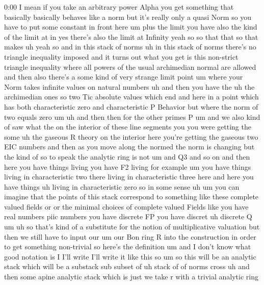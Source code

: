 \begin{unfinished}{0:00}
I  mean  if  you  take  an  arbitrary  power
Alpha  you  get  something  that  basically
basically  behaves  like  a  norm  but  it's
really  only  a  quasi  Norm  so  you  have  to
put  some  constant  in  front  here
um  plus  the  limit  you  have  also  the  kind
of  the  limit  at  in  yes  there's  also  the
limit  at  Infinity  yeah  so  so  that  that
so  that  makes  uh  yeah  so  and  in  this
stack  of  norms  uh  in  this  stack  of  norms
there's  no  triangle  inequality  imposed
and  it  turns  out  what  you  get  is  this
non-strict  triangle  inequality  where  all
powers  of  the  usual  archimedian  normal
are  allowed  and  then  also  there's  a  some
kind  of  very  strange  limit  point  um
where  your  Norm  takes  infinite  values  on
natural
numbers  uh  and  then  you  have  the  uh  the
archimedian  ones  so  two  Tic  absolute
values  which  end  and  here  in  a  point
which  has  both  characteristic  zero  and
characteristic  P  Behavior  but  where  the
norm  of  two  equals  zero
um  uh  and  then  then  for  the  other  primes
P  um
and  we  also  kind  of  saw  what  the  on  the
interior  of  these  line  segments  you  you
were  getting  the
some  uh  the  gaseous  R  theory  on  the
interior  here  you're  getting  the  gaseous
two  EIC  numbers  and  then  as  you  move
along  the  normed  the  norm  is  changing
but  the  kind  of  so  to  speak  the  analytic
ring  is  not  um  and  Q3  and  so  on  and  then
here  you  have  things  living  you  have  F2
living  for  example  um  you  have  things
living  in  characteristic  two  there
living  in  characteristic  three  here  and
here  you  have  things  uh  living  in
characteristic  zero  so  in  some  sense
uh
um  you  can  imagine  that  the  points  of
this  stack  correspond  to  something  like
these  complete  valued  fields  or  or  the
minimal  choices  of  complete  valued
Fields  like  you  have  real  numbers  piic
numbers  you  have  discrete  FP  you  have
discret  uh  discrete  Q
um  uh  so  that's  kind  of  a  substitute  for
the  notion  of  multiplicative  valuation
but  then  we  still  have  to  input  our  um
our  Bon  ring  R  into  the  construction  in
order  to  get  something  non-trivial  so
here's  the  definition  um  and  I  don't
know  what  good  notation  is  I  I'll  write
I'll  write  it  like  this
so
um  so  this  will  be  an  analytic  stack
which  will  be  a  substack  sub  subset  of
uh  stack  of  of  norms  cross  uh  and  then
some  apine  analytic  stack  which  is  just
we  take  r  with  a  trivial  analytic  ring

\end{unfinished}
